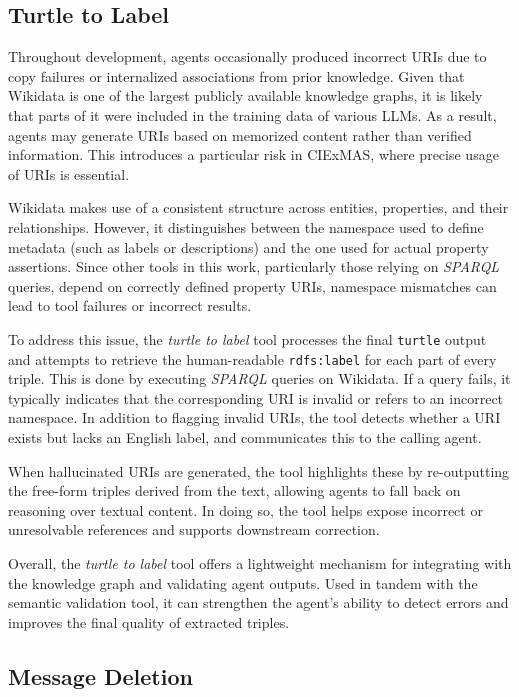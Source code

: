\documentclass[a4paper,oneside,bibliography=totoc]{scrbook}
\begin{document}
\subsection{Turtle to Label}
\label{subsec:turtle_to_label}

Throughout development, agents occasionally produced incorrect URIs due to copy failures or internalized associations from prior knowledge. Given that Wikidata is one of the largest publicly available knowledge graphs, it is likely that parts of it were included in the training data of various \acp{LLM}. As a result, agents may generate URIs based on memorized content rather than verified information. This introduces a particular risk in CIExMAS, where precise usage of \acp{URI} is essential.

Wikidata makes use of a consistent structure across entities, properties, and their relationships. However, it distinguishes between the namespace used to define metadata (such as labels or descriptions) and the one used for actual property assertions. Since other tools in this work, particularly those relying on \textit{SPARQL} queries, depend on correctly defined property URIs, namespace mismatches can lead to tool failures or incorrect results.

To address this issue, the \textit{turtle to label} tool processes the final \texttt{turtle} output and attempts to retrieve the human-readable \texttt{rdfs:label} for each part of every triple. This is done by executing \textit{SPARQL} queries on Wikidata. If a query fails, it typically indicates that the corresponding URI is invalid or refers to an incorrect namespace. In addition to flagging invalid URIs, the tool detects whether a URI exists but lacks an English label, and communicates this to the calling agent.

When hallucinated URIs are generated, the tool highlights these by re-outputting the free-form triples derived from the text, allowing agents to fall back on reasoning over textual content. In doing so, the tool helps expose incorrect or unresolvable references and supports downstream correction.

Overall, the \textit{turtle to label} tool offers a lightweight mechanism for integrating with the knowledge graph and validating agent outputs. Used in tandem with the semantic validation tool, it can strengthen the agent’s ability to detect errors and improves the final quality of extracted triples.

\subsection{Message Deletion}
\label{subsec:message_deletion}
\end{document}
